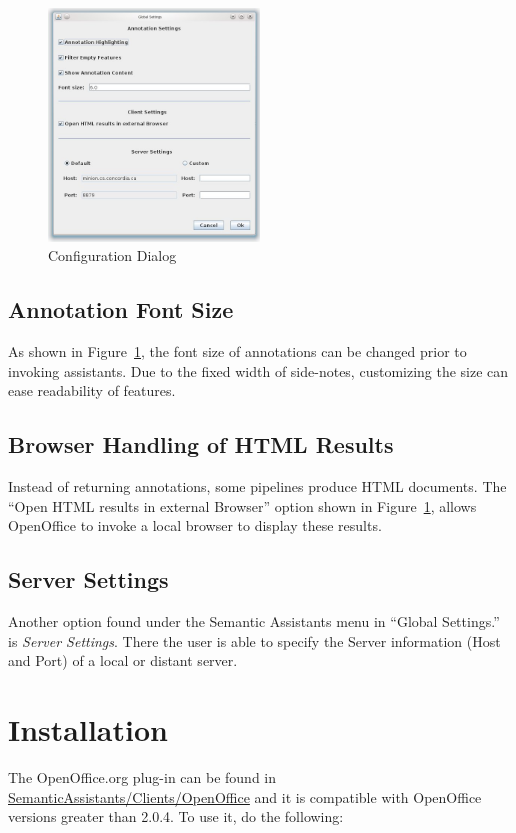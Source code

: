 \begin{figure}[htb]
\begin{center}
  \includegraphics[width=0.5\textwidth]{pictures/oosettings.jpg}
  \caption{Configuration Dialog}
  \label{fig:oosettings}
\end{center}
\end{figure}

\subsection{Annotation Font Size}
As shown in Figure~\ref{fig:oosettings}, the font size of annotations can be changed
prior to invoking assistants. Due to the fixed width of side-notes, customizing the
size can ease readability of features.

\subsection{Browser Handling of HTML Results}
Instead of returning annotations, some pipelines produce HTML documents. The
``Open HTML results in external Browser'' option shown in Figure~\ref{fig:oosettings},
allows OpenOffice to invoke a local browser to display these results.

\subsection{Server Settings}
Another option found under the Semantic Assistants menu in ``Global
Settings.'' is \emph{Server Settings}.  There the user is able to specify the
Server information (Host and Port) of a local or distant server.

\section{Installation}
\label{subsec:oo-inst}
The OpenOffice.org plug-in can be found in
\url{SemanticAssistants/Clients/OpenOffice} and it is compatible with 
OpenOffice versions greater than 2.0.4. To use it, do the following:

